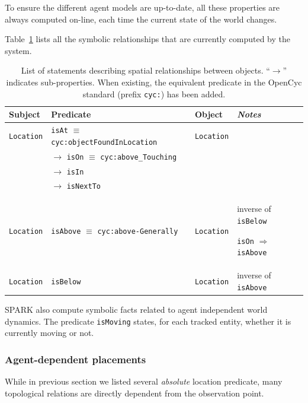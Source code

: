 \documentclass{svmult}
\newcommand{\concept}[1]{{\footnotesize \texttt{#1}}}
\begin{document}
To ensure the different agent models are up-to-date, all these properties are
always computed on-line, each time the current state of the world changes.

Table~\ref{facts|sprelations} lists all the symbolic relationships that are
currently computed by the system.

\begin{table}[h]
    \centering
    \begin{tabular}{p{1.5cm}p{5cm}p{2cm}p{2.7cm}}
	\rowcolor{white}
    \textbf{Subject} & \textbf{Predicate} & \textbf{Object} & \emph{Notes} \\ 
    \hline
	 \concept{Location} & \concept{isAt} $\equiv$ \concept{cyc:objectFoundInLocation}  &  \concept{Location} & \\ 
	 &  $\rightarrow$ \concept{isOn} $\equiv$ \concept{cyc:above\_Touching}  &  & \\ 
	 &  $\rightarrow$ \concept{isIn}  &  & \\ 
	 &  $\rightarrow$ \concept{isNextTo}  & &  \\ 
	 \concept{Location}  & \concept{isAbove} $\equiv$ \concept{cyc:above-Generally}  &  \concept{Location}  &  inverse of \concept{isBelow} \par \concept{isOn} $\Rightarrow$ \concept{isAbove}\\ 
	 \concept{Location}  & \concept{isBelow}  & \concept{Location}  &  inverse of \concept{isAbove}
	\end{tabular}

	\caption{List of statements describing spatial relationships between
	objects. ``$\rightarrow$'' indicates sub-properties. When existing, the
	equivalent predicate in the {\sc OpenCyc} standard (prefix \concept{cyc:})
	has been added.}

\label{facts|sprelations}
\end{table}

SPARK also compute symbolic facts related to agent independent world dynamics.
The predicate \concept{isMoving} states, for each tracked entity, whether it is
currently moving or not.


\subsubsection{Agent-dependent placements}

While in previous section we listed several \emph{absolute} location predicate,
many topological relations are directly dependent from the observation point.
\end{document}
